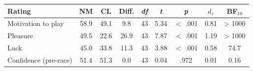 \begin{tabular}{lcccccccc}
\toprule
Rating & NM & CL & Diff. & \textit{df} & \textit{t} & \textit{p} & $d_z$ & BF$_{10}$ \\
\midrule
Motivation to play & 58.9 & 49.1 & 9.8 & 43 & 5.34 & $<$ .001 & 0.81 & > 1000 \\
Pleasure & 49.5 & 22.6 & 26.9 & 43 & 7.87 & $<$ .001 & 1.19 & > 1000 \\
Luck & 45.0 & 33.8 & 11.3 & 43 & 3.88 & $<$ .001 & 0.58 & 74.7 \\
Confidence (pre-race) & 51.4 & 51.3 & 0.0 & 43 & 0.04 & .972 & 0.01 & 0.16 \\
\bottomrule
\end{tabular}
